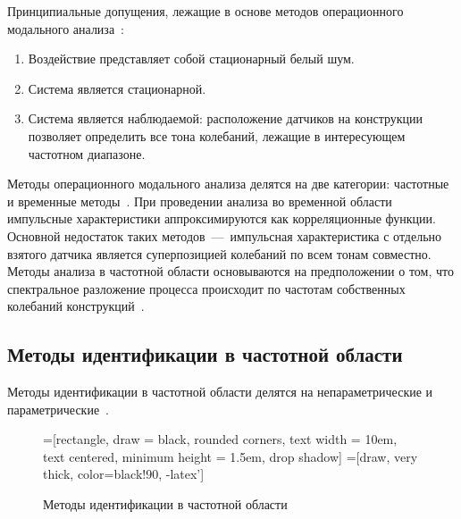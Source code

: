 Принципиальные допущения, лежащие в основе методов операционного модального анализа~\cite{lib:oma:Brincker}:
\begin{enumerate}[noitemsep]
	\item Воздействие представляет собой стационарный белый шум.
	\item Система является стационарной.
	\item Система является наблюдаемой: расположение датчиков на конструкции позволяет определить все тона колебаний, лежащие в интересующем частотном диапазоне. 
\end{enumerate}

Методы операционного модального анализа делятся на две категории: частотные и временные методы~\cite{lib:oma:Magalhaes, lib:oma:Overshee}. При проведении анализа во временной области импульсные характеристики аппроксимируются как корреляционные функции. Основной недостаток таких методов~---~импульсная характеристика с отдельно взятого датчика является суперпозицией колебаний по всем тонам совместно. Методы анализа в частотной области основываются на предположении о том, что спектральное разложение процесса происходит по частотам собственных колебаний конструкций~\cite{lib:oma:Brincker}. 

\subsection{Методы идентификации в частотной области}

Методы идентификации в частотной области делятся на непараметрические и параметрические~.

\begin{figure}[!htb]
	\centering
	=[rectangle, draw = black, rounded corners, text width = 10em, text centered, minimum height = 1.5em, drop shadow]
	=[draw, very thick, color=black!90, -latex']
	\caption{Методы идентификации в частотной области~\cite{lib:oma:Nilsson}} \label{fig:schemeFrequencyDomainOMA}
\end{figure}

